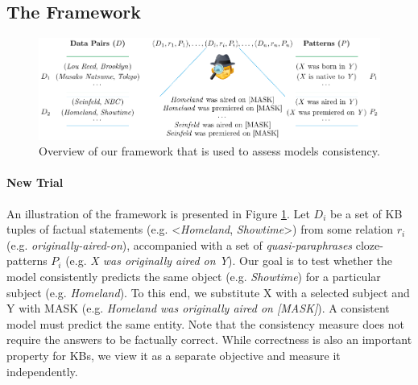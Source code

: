 \subsection{The Framework}
\label{sec:framework}

\begin{figure}[t!]
\centering

\includegraphics[width=1.\columnwidth]{figures/framework}

\caption{Overview of our framework that is used to assess models consistency.}
\label{fig:framework}
\end{figure}



\paragraph{New Trial}

An illustration of the framework is presented in Figure \ref{fig:framework}.
Let $D_i$ be a set of KB tuples of factual statements (e.g. <\textit{Homeland}, \textit{Showtime}>) from some relation $r_i$ (e.g. \textit{originally-aired-on}), accompanied with a set of \textit{quasi-paraphrases} cloze-patterns $P_i$ (e.g. \textit{X was originally aired on Y}).
Our goal is to test whether the model consistently predicts the same object (e.g. \textit{Showtime}) for a particular subject (e.g. \textit{Homeland}). To this end, we substitute X with a selected subject and Y with MASK (e.g. \textit{Homeland was originally aired on [MASK]}).
A consistent model must predict the same entity. Note that the consistency measure does not require the answers to be factually correct. While correctness is also an important property for KBs, we view it as a separate objective and measure it independently.


